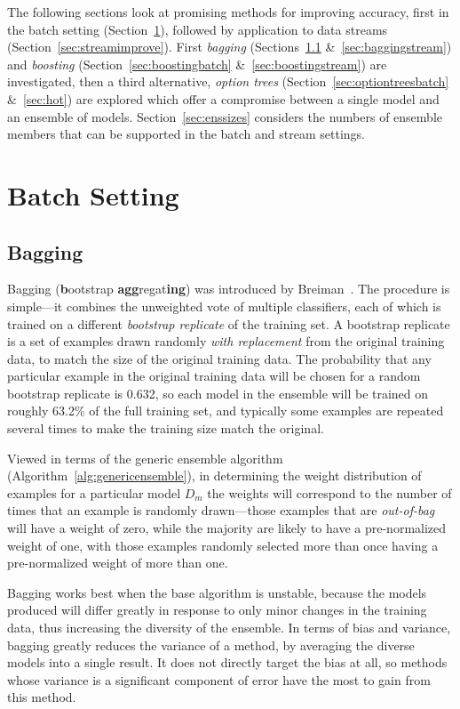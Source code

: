 The following sections look at promising methods for improving accuracy, first in the batch setting (Section~\ref{sec:batchimprove}), followed by application to data streams (Section~\ref{sec:streamimprove}). 
First {\em bagging} (Sections~\ref{sec:baggingbatch} \&~\ref{sec:baggingstream}) and {\em boosting} (Section~\ref{sec:boostingbatch} \&~\ref{sec:boostingstream}) are investigated, then a third alternative, {\em option trees} (Section~\ref{sec:optiontreesbatch} \&~\ref{sec:hot}) are explored which offer a compromise between a single model and an ensemble of models.
Section~\ref{sec:enssizes} considers the numbers of ensemble members that can be supported in the batch and stream settings.

\section{Batch Setting}
\label{sec:batchimprove}

\subsection{Bagging}
\label{sec:baggingbatch}

Bagging ({\bf b}ootstrap {\bf agg}regat{\bf ing}) was introduced by Breiman~\cite{bagging}. The procedure is simple---it combines the unweighted vote of multiple classifiers, each of which is trained on a different {\em bootstrap replicate} of the training set. A bootstrap replicate is a set of examples drawn randomly {\em with replacement} from the original training data, to match the size of the original training data. The probability that any particular example in the original training data will be chosen for a random bootstrap replicate is 0.632, so each model in the ensemble will be trained on roughly 63.2\% of the full training set, and typically some examples are repeated several times to make the training size match the original.

Viewed in terms of the generic ensemble algorithm (Algorithm~\ref{alg:genericensemble}), in determining the weight distribution of examples for a particular model $D_{m}$ the weights will correspond to the number of times that an example is randomly drawn---those examples that are {\em out-of-bag} will have a weight of zero, while the majority are likely to have a pre-normalized weight of one, with those examples randomly selected more than once having a pre-normalized weight of more than one.

Bagging works best when the base algorithm is unstable, because the models produced will differ greatly in response to only minor changes in the training data, thus increasing the diversity of the ensemble. In terms of bias and variance, bagging greatly reduces the variance of a method, by averaging the diverse models into a single result. It does not directly target the bias at all, so methods whose variance is a significant component of error have the most to gain from this method.


